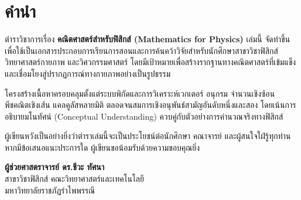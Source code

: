 \chapter*{คำนำ}

ตำราวิชาการเรื่อง \textbf{คณิตศาสตร์สำหรับฟิสิกส์ (Mathematics for Physics)} เล่มนี้ จัดทำขึ้นเพื่อใช้เป็นเอกสารประกอบการเรียนการสอนและการค้นคว้าวิจัยสำหรับนักศึกษาสาขาวิชาฟิสิกส์ วิทยาศาสตร์กายภาพ และวิศวกรรมศาสตร์ โดยมีเป้าหมายเพื่อสร้างรากฐานทางคณิตศาสตร์ที่เข้มแข็งและเชื่อมโยงสู่ปรากฏการณ์ทางกายภาพอย่างเป็นรูปธรรม

โครงสร้างเนื้อหาครอบคลุมตั้งแต่ระบบพิกัดและการวิเคราะห์เวกเตอร์ อนุกรม จำนวนเชิงซ้อน พีชคณิตเชิงเส้น แคลคูลัสหลายมิติ ตลอดจนสมการเชิงอนุพันธ์สามัญอันดับหนึ่งและสอง โดยเน้นการอธิบายมโนทัศน์ (Conceptual Understanding) ควบคู่กับตัวอย่างการคำนวณจริงทางฟิสิกส์

ผู้เขียนหวังเป็นอย่างยิ่งว่าตำราเล่มนี้จะเป็นประโยชน์ต่อนักศึกษา คณาจารย์ และผู้สนใจใฝ่รู้ทุกท่าน หากมีข้อเสนอแนะประการใด ผู้เขียนขอน้อมรับด้วยความขอบคุณยิ่ง

\vspace{1.5cm}
\begin{flushright}
    \textbf{ผู้ช่วยศาสตราจารย์ ดร.ชีวะ ทัศนา}\\
    สาขาวิชาฟิสิกส์ คณะวิทยาศาสตร์และเทคโนโลยี\\
    มหาวิทยาลัยราชภัฏรำไพพรรณี
\end{flushright}
